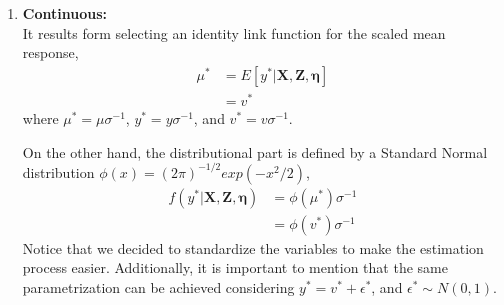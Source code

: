 \begin{enumerate}
	
	\item \textbf{Continuous:} \\
	It results form selecting an identity link function for the scaled mean response,
	\begin{equation} \label{eq:link_cont}
		\begin{split}
		\mu^{*} &= E[y^{*} | \mathbf{X}, \mathbf{Z}, \pmb{\eta}] \\ 
		&= v^{*}
		\end{split}
	\end{equation}
	where $\mu^{*} = \mu \sigma^{-1}$, $y^{*} = y \sigma^{-1}$, and $v^{*} = v \sigma^{-1}$. 
	
	On the other hand, the distributional part is defined by a Standard Normal distribution $\phi(x)=(2 \pi)^{-1/2} exp(-x^{2}/2 )$,
	\begin{equation} \label{eq:dist_cont}
		\begin{split}
		f(y^{*}| \mathbf{X}, \mathbf{Z}, \pmb{\eta}) &= \phi(\mu^{*}) \sigma^{-1} \\
		&= \phi(v^{*}) \sigma^{-1}
		\end{split}
	\end{equation}
	Notice that we decided to standardize the variables to make the estimation process easier. Additionally, it is important to mention that the same parametrization can be achieved considering $y^{*} = v^{*} + \epsilon^{*}$, and $\epsilon^{*} \sim N(0, 1)$.
	
	
	

\end{enumerate}
